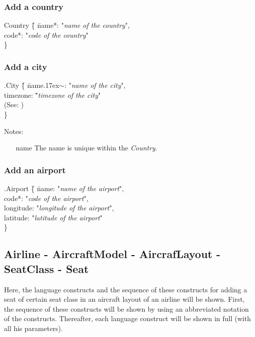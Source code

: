 \documentclass[a4paper,11pt]{article}
\newcommand{\dsltype}[1]{\textit{#1}}
\newcommand{\mytilde}{{\raise.17ex\hbox{\(\scriptstyle\sim\)}}}
\begin{document}
\subsubsection*{Add a country}
\begin{tabbing}
Country \= \{ \= name*: "\textit{name of the country}", \\
	\> \> code*: "\textit{code of the country}" \\
\> \} \\
\end{tabbing}

\subsubsection*{Add a city}
\begin{tabbing}
.City \= \{ \= name\mytilde: "\textit{name of the city}", \\
	\> \> timezone: \= "\textit{timezone of the city}" \\
    \> \> \> (See: ) \\
\> \} \\
\end{tabbing}
Notes:
\begin{enumerate}
\item[name] The name is unique within the \dsltype{Country}.
\end{enumerate}

\subsubsection*{Add an airport}
\begin{tabbing}
.Airport \= \{ \= name: "\textit{name of the airport}", \\
	\> \> code*: "\textit{code of the airport}", \\
	\> \> longitude: "\textit{longitude of the airport}", \\
	\> \> latitude: "\textit{latitude of the airport}" \\
\> \} \\
\end{tabbing}

\subsection*{Airline - AircraftModel - AircrafLayout - SeatClass - Seat}
Here, the language constructs and the sequence of these constructs for adding a seat of certain seat class in an aircraft layout of an airline will be shown. First, the sequence of these constructs will be shown by using an abbreviated notation of the constructs. Thereafter, each language construct will be shown in full (with all his parameters).
\end{document}
